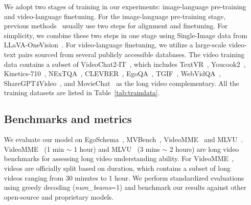 We adopt two stages of training in our experiments: image-language pre-training and video-language finetuning. For the image-language pre-training stage, previous methods~\citep{chen2023shikra,peng2023kosmos,wang2023cogvlm,chen2023minigpt,liu2024llavanext,dong2024internlm} usually use two steps for alignment and finetuning. For simplicity, we combine these two steps in one stage using Single-Image data from LLaVA-OneVision~\citep{li2024llava}. For video-language finetuning, we utilize a large-scale video-text pairs sourced from several publicly accessible databases. The video training data contains a subset of VideoChat2-IT~\citep{li2024mvbench}, which includes TextVR~\citep{wu2025large}, Youcook2~\citep{zhou2018towards}, Kinetics-710~\citep{kay2017kinetics}, NExTQA~\citep{xiao2021next}, CLEVRER~\citep{yi2019clevrer}, EgoQA~\citep{fan2019egovqa}, TGIF~\citep{li2016tgif}, WebVidQA~\citep{yang2021just}, ShareGPT4Video~\citep{chen2024sharegpt4video}, and MovieChat~\citep{song2024moviechat} as the long video complementary. All the training datasets are listed in Table~\ref{tab:traindata}.

\subsection{Benchmarks and metrics}
We evaluate our model on EgoSchema~\citep{mangalam2024egoschema}, MVBench~\citep{li2024mvbench}, VideoMME~\citep{fu2024video} and MLVU~\citep{zhou2024mlvu}. VideoMME~\citep{fu2024video} (1 min $\sim$ 1 hour) and MLVU~\citep{zhou2024mlvu} (3 mins $\sim$ 2 hours) are long video benchmarks for assessing long video understanding ability. For VideoMME~\citep{fu2024video}, videos are officially split based on duration, which  contains a subset of long videos ranging from 30 minutes to 1 hour. We perform standardized evaluations using greedy decoding (\textit{num\_beams}=1) and benchmark our results against other open-source and proprietary models.


